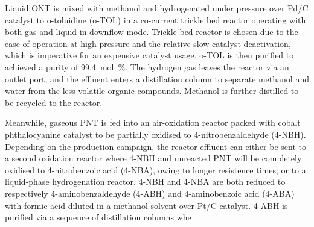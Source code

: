 Liquid ONT is mixed with methanol and hydrogenated under pressure over Pd/C catalyst to o-toluidine (o-TOL) in a co-current trickle bed reactor operating with both gas and liquid in downflow mode. Trickle bed reactor is chosen due to the ease of operation at high pressure and the relative slow catalyst deactivation, which is imperative for an expensive catalyst usage. o-TOL is then purified to achieved a purity of \SI{99.4}{mol\percent}. The hydrogen gas leaves the reactor via an outlet port, and the effluent enters a distillation column to separate methanol and water from the less volatile organic compounds. Methanol is further distilled to be recycled to the reactor. 

Meanwhile, gaseous PNT is fed into an air-oxidation reactor packed with cobalt phthalocyanine catalyst to be partially oxidised to 4-nitrobenzaldehyde (4-NBH). Depending on the production campaign, the reactor effluent can either be sent to a second oxidation reactor where 4-NBH and unreacted PNT will be completely oxidised to 4-nitrobenzoic acid (4-NBA), owing to longer resistence times; or to a liquid-phase hydrogenation reactor. 4-NBH and 4-NBA are both reduced to respectively 4-aminobenzaldehyde (4-ABH) and 4-aminobenzoic acid (4-ABA) with formic acid diluted in a methanol solvent over Pt/C catalyst. 4-ABH is purified via a sequence of distillation columns whe





 

